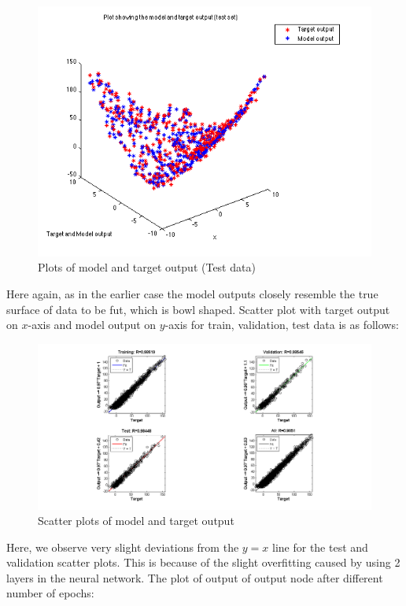 \documentclass{article}
\begin{document}
\begin{figure}[H]
\centering
\includegraphics[width=0.5\linewidth]{Regression/bivariate/output_2layer_test.png}
\caption{Plots of model and target output (Test data)}
\end{figure}

\begin{flushleft}

Here again, as in the earlier case the model outputs closely resemble the true surface of data to be fut, which is bowl shaped.
Scatter plot with target output on $x$-axis and model output on $y$-axis for train, validation, test data is as follows:
\end{flushleft}


\begin{figure}[H]
\centering
\includegraphics[width=1.2\linewidth]{Regression/bivariate/scatter_2layers.png}
\caption{Scatter plots of model and target output}
\end{figure}

Here, we observe very slight deviations from the $y = x$ line for the test and validation scatter plots. This is because of the slight overfitting caused by using 2 layers in the neural network.
The plot of output of output node after different number of epochs:
\end{document}
